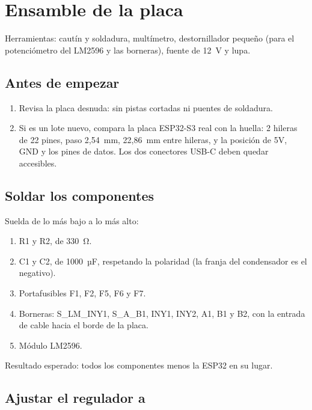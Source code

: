 \chapter{Ensamble de la placa}\label{cap:ensamble}

Herramientas: cautín y soldadura, multímetro, destornillador pequeño (para el potenciómetro del LM2596 y las borneras), fuente de 12~V y lupa.

\section{Antes de empezar}

\begin{enumerate}
\item Revisa la placa desnuda: sin pistas cortadas ni puentes de soldadura.
\item Si es un lote nuevo, compara la placa ESP32-S3 real con la huella: 2 hileras de 22 pines, paso 2,54~mm, 22,86~mm entre hileras, y la posición de 5V, GND y los pines de datos. Los dos conectores USB-C deben quedar accesibles.
\end{enumerate}

\section{Soldar los componentes}

Suelda de lo más bajo a lo más alto:
\begin{enumerate}
\item R1 y R2, de 330~Ω.
\item C1 y C2, de 1000~µF, respetando la polaridad (la franja del condensador es el negativo).
\item Portafusibles F1, F2, F5, F6 y F7.
\item Borneras: S\_LM\_INY1, S\_A\_B1, INY1, INY2, A1, B1 y B2, con la entrada de cable hacia el borde de la placa.
\item Módulo LM2596.
\end{enumerate}
Resultado esperado: todos los componentes menos la ESP32 en su lugar.

\section{Ajustar el regulador a }


